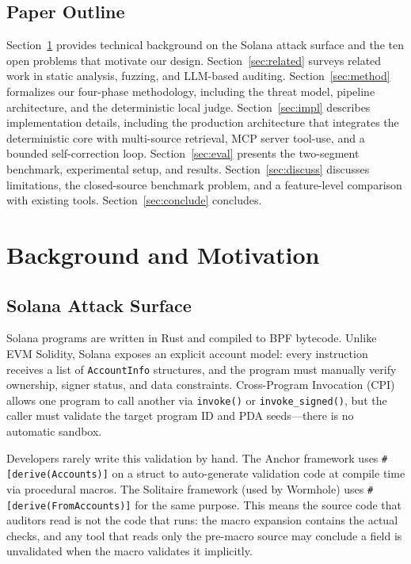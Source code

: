 \documentclass{article}
\begin{document}
\subsection{Paper Outline}
\label{sec:outline}

Section~\ref{sec:background} provides technical background on the Solana attack surface and the ten open problems that motivate our design. Section~\ref{sec:related} surveys related work in static analysis, fuzzing, and LLM-based auditing. Section~\ref{sec:method} formalizes our four-phase methodology, including the threat model, pipeline architecture, and the deterministic local judge. Section~\ref{sec:impl} describes implementation details, including the production architecture that integrates the deterministic core with multi-source retrieval, MCP server tool-use, and a bounded self-correction loop. Section~\ref{sec:eval} presents the two-segment benchmark, experimental setup, and results. Section~\ref{sec:discuss} discusses limitations, the closed-source benchmark problem, and a feature-level comparison with existing tools. Section~\ref{sec:conclude} concludes.


\section{Background and Motivation}
\label{sec:background}

\subsection{Solana Attack Surface}

Solana programs are written in Rust and compiled to BPF bytecode. Unlike EVM Solidity, Solana exposes an explicit account model: every instruction receives a list of \texttt{AccountInfo} structures, and the program must manually verify ownership, signer status, and data constraints. Cross-Program Invocation (CPI) allows one program to call another via \texttt{invoke()} or \texttt{invoke\_signed()}, but the caller must validate the target program ID and PDA seeds---there is no automatic sandbox.

Developers rarely write this validation by hand. The Anchor framework uses \texttt{\#[derive(Accounts)]} on a struct to auto-generate validation code at compile time via procedural macros. The Solitaire framework (used by Wormhole) uses \texttt{\#[derive(FromAccounts)]} for the same purpose. This means the source code that auditors read is not the code that runs: the macro expansion contains the actual checks, and any tool that reads only the pre-macro source may conclude a field is unvalidated when the macro validates it implicitly.
\end{document}
